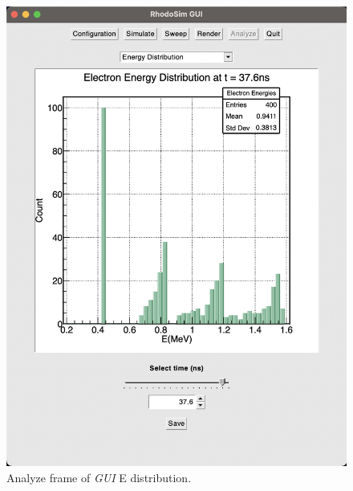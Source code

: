 \documentclass[a4paper,oneside,12pt]{report}
\numberwithin{equation}{chapter}
\begin{document}
\begin{figure}
    \centering
    \includegraphics[width=0.8\linewidth]{./figures/rhodoSim/GUI_analyze_Edist.png}
    \caption{Analyze frame of \textit{GUI} E distribution.}
    \label{fig:gui_analyze_Edist}
\end{figure}
\end{document}
